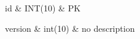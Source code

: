 id & INT(10) & PK \tabularnewline\hline 












  version & int(10) & no description \tabularnewline\hline









